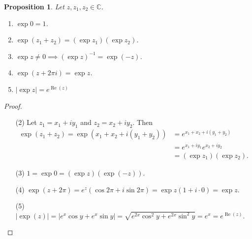 \documentclass[12pt,openany]{book}
\newtheorem{proposition}[theorem]{Proposition}
\theoremstyle{definition}
\newcommand{\C}{\mathbb{C}}
\newcommand{\of}[1]{\left( #1 \right)}
\newcommand{\abs}[1]{\left\lvert #1 \right\rvert}
\newcommand{\inv}[1]{{#1}^{-1}}
\renewcommand{\Re}{\operatorname{Re}}
\begin{document}
	\begin{tcolorbox}[colback=white,colframe=procolor,arc=5pt,title={\color{white}\bf Properties of Complex Expoenential}]
		\begin{proposition}
			Let $z,z_1,z_2\in\C$. \begin{enumerate}[(1)]
				\item $\exp 0 = 1$.
				\item $\exp\of{z_1+z_2}=(\exp z_1)(\exp z_2)$.
				\item $\exp z\neq 0\implies\inv{\of{\exp z}}=\exp(-z)$.
				\item $\exp(z+2\pi i)=\exp z$.
				\item $\abs{\exp z}=e^{\Re\of{z}}$
			\end{enumerate}
		\end{proposition}
	\end{tcolorbox}
	\begin{proof}
		\begin{itemize}
			\item[(2)] Let $z_1=x_1+iy_1$ and $z_2=x_2+iy_2$. Then \begin{align*}
				\exp\of{z_1+z_2}=\exp\of{x_1+x_2+i(y_1+y_2)}&=e^{x_1+x_2+i(y_1+y_2)}\\
				&=e^{x_1+iy_1}e^{x_2+iy_2}\\
				&=\of{\exp z_1}\of{\exp z_2}.
			\end{align*}
			\item[(3)] $1=\exp 0=\of{\exp z}\of{\exp (-z)}$.
			\item[(4)] $\exp (z+2\pi)=e^z\of{\cos 2\pi+i\sin 2\pi}=\exp z(1+i\cdot 0)=\exp z$.
			\item[(5)] $\abs{\exp\of{z}}=\abs{e^x\cos y+e^x\sin y}=\sqrt{e^{2x}\cos^2y+e^{2x}\sin^2y}=e^x=e^{\Re\of{z}}$.
		\end{itemize}
	\end{proof}
	\newpage
\end{document}
